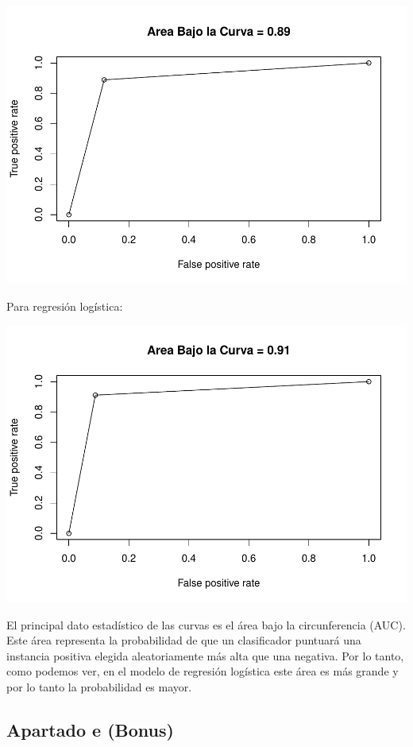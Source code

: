 \documentclass[]{article}
\begin{document}
\includegraphics{TrabajoPracticas3_files/figure-latex/unnamed-chunk-19-1.pdf}

Para regresión logística:

\includegraphics{TrabajoPracticas3_files/figure-latex/unnamed-chunk-21-1.pdf}

El principal dato estadístico de las curvas es el área bajo la
circunferencia (AUC). Este área representa la probabilidad de que un
clasificador puntuará una instancia positiva elegida aleatoriamente más
alta que una negativa. Por lo tanto, como podemos ver, en el modelo de
regresión logística este área es más grande y por lo tanto la
probabilidad es mayor.

\subsection{Apartado e (Bonus)}\label{apartado-e-bonus}
\end{document}
